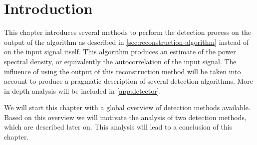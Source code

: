 \documentclass[a4paper, openany, oneside]{memoir}
\begin{document}
\section{Introduction}
This chapter introduces several methods to perform the detection process on the output of the algorithm as described in \cref{sec:reconstruction-algorithm} instead of on the input signal itself. This algorithm produces an estimate of the power spectral density, or equivalently the autocorrelation of the input signal. The influence of using the output of this reconstruction method will be taken into account to produce a pragmatic description of several detection algorithms.  More in depth analysis will be included in \cref{app:detector}.

We will start this chapter with a global overview of detection methods available. Based on this overview we will motivate the analysis of two detection methods, which are described later on. This analysis will lead to a conclusion of this chapter.
\end{document}
